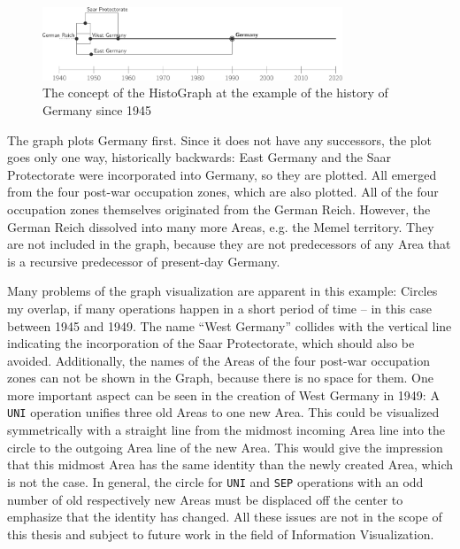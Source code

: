 \begin{figure}[ht]
  \vspace{0.5em}
  \centering
  \includegraphics[width=0.8\textwidth]{graphics/development/histograph/example_germany}
  \caption{The concept of the HistoGraph at the example of the history of Germany since 1945}
  \label{fig:example_germany}
\end{figure}

The graph plots Germany first. Since it does not have any successors, the plot goes only one way, historically backwards: East Germany and the Saar Protectorate were incorporated into Germany, so they are plotted. All emerged from the four post-war occupation zones, which are also plotted. All of the four occupation zones themselves originated from the German Reich. However, the German Reich dissolved into many more Areas, e.g. the Memel territory. They are not included in the graph, because they are not predecessors of any Area that is a recursive predecessor of present-day Germany.

Many problems of the graph visualization are apparent in this example: Circles my overlap, if many operations happen in a short period of time -- in this case between 1945 and 1949.
The name ``West Germany'' collides with the vertical line indicating the incorporation of the Saar Protectorate, which should also be avoided.
Additionally, the names of the Areas of the four post-war occupation zones can not be shown in the Graph, because there is no space for them.
One more important aspect can be seen in the creation of West Germany in 1949: A \texttt{UNI} operation unifies three old Areas to one new Area. This could be visualized symmetrically with a straight line from the midmost incoming Area line into the circle to the outgoing Area line of the new Area. This would give the impression that this midmost Area has the same identity than the newly created Area, which is not the case. In general, the circle for \texttt{UNI} and \texttt{SEP} operations with an odd number of old respectively new Areas must be displaced off the center to emphasize that the identity has changed.
All these issues are not in the scope of this thesis and subject to future work in the field of Information Visualization.

